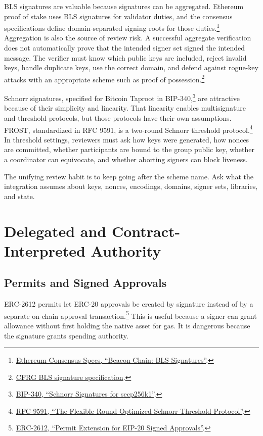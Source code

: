 BLS signatures are valuable because signatures can be aggregated. Ethereum proof of stake uses BLS signatures for validator duties, and the consensus specifications define domain-separated signing roots for those duties.\footnote{\href{https://ethereum.github.io/consensus-specs/specs/phase0/beacon-chain/\#bls-signatures}{Ethereum Consensus Specs, ``Beacon Chain: BLS Signatures''}.} Aggregation is also the source of review risk. A successful aggregate verification does not automatically prove that the intended signer set signed the intended message. The verifier must know which public keys are included, reject invalid keys, handle duplicate keys, use the correct domain, and defend against rogue-key attacks with an appropriate scheme such as proof of possession.\footnote{\href{https://datatracker.ietf.org/doc/html/draft-irtf-cfrg-bls-signature}{CFRG BLS signature specification}.}

Schnorr signatures, specified for Bitcoin Taproot in BIP-340,\footnote{\href{https://github.com/bitcoin/bips/blob/master/bip-0340.mediawiki}{BIP-340, ``Schnorr Signatures for secp256k1''}.} are attractive because of their simplicity and linearity. That linearity enables multisignature and threshold protocols, but those protocols have their own assumptions. FROST, standardized in RFC 9591, is a two-round Schnorr threshold protocol.\footnote{\href{https://www.rfc-editor.org/rfc/rfc9591.html}{RFC 9591, ``The Flexible Round-Optimized Schnorr Threshold Protocol''}.} In threshold settings, reviewers must ask how keys were generated, how nonces are committed, whether participants are bound to the group public key, whether a coordinator can equivocate, and whether aborting signers can block liveness.

The unifying review habit is to keep going after the scheme name. Ask what the integration assumes about keys, nonces, encodings, domains, signer sets, libraries, and state.

\section{Delegated and Contract-Interpreted Authority}

\subsection{Permits and Signed Approvals}

ERC-2612 permits let ERC-20 approvals be created by signature instead of by a separate on-chain approval transaction.\footnote{\href{https://eips.ethereum.org/EIPS/eip-2612}{ERC-2612, ``Permit Extension for EIP-20 Signed Approvals''}.} This is useful because a signer can grant allowance without first holding the native asset for gas. It is dangerous because the signature grants spending authority.

